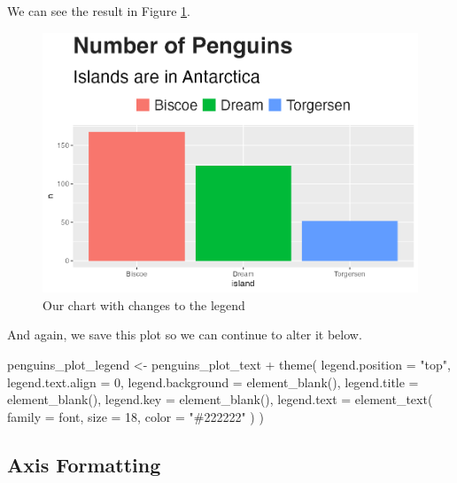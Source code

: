 \documentclass[
]{book}
\newenvironment{Shaded}{\begin{snugshade}}{\end{snugshade}}
\newcommand{\AttributeTok}[1]{\textcolor[rgb]{0.77,0.63,0.00}{#1}}
\newcommand{\DecValTok}[1]{\textcolor[rgb]{0.00,0.00,0.81}{#1}}
\newcommand{\FunctionTok}[1]{\textcolor[rgb]{0.00,0.00,0.00}{#1}}
\newcommand{\NormalTok}[1]{#1}
\newcommand{\OtherTok}[1]{\textcolor[rgb]{0.56,0.35,0.01}{#1}}
\newcommand{\SpecialCharTok}[1]{\textcolor[rgb]{0.00,0.00,0.00}{#1}}
\newcommand{\StringTok}[1]{\textcolor[rgb]{0.31,0.60,0.02}{#1}}
\begin{document}
We can see the result in Figure \ref{fig:penguins-plot-legend-plot}.

\begin{figure}
\includegraphics[width=1\linewidth]{custom-theme_files/figure-latex/penguins-plot-legend-plot-1} \caption{Our chart with changes to the legend}\label{fig:penguins-plot-legend-plot}
\end{figure}

And again, we save this plot so we can continue to alter it below.

\begin{Shaded}
\begin{Highlighting}[]
\NormalTok{penguins\_plot\_legend }\OtherTok{\textless{}{-}}\NormalTok{ penguins\_plot\_text }\SpecialCharTok{+}
  \FunctionTok{theme}\NormalTok{(}
    \AttributeTok{legend.position =} \StringTok{"top"}\NormalTok{,}
    \AttributeTok{legend.text.align =} \DecValTok{0}\NormalTok{,}
    \AttributeTok{legend.background =} \FunctionTok{element\_blank}\NormalTok{(),}
    \AttributeTok{legend.title =} \FunctionTok{element\_blank}\NormalTok{(),}
    \AttributeTok{legend.key =} \FunctionTok{element\_blank}\NormalTok{(),}
    \AttributeTok{legend.text =} \FunctionTok{element\_text}\NormalTok{(}
      \AttributeTok{family =}\NormalTok{ font,}
      \AttributeTok{size =} \DecValTok{18}\NormalTok{,}
      \AttributeTok{color =} \StringTok{"\#222222"}
\NormalTok{    )}
\NormalTok{  )}
\end{Highlighting}
\end{Shaded}

\hypertarget{axis-formatting}{%
\subsection*{Axis Formatting}\label{axis-formatting}}
\end{document}
